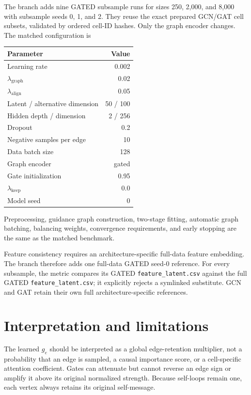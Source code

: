 \documentclass[11pt]{article}
\newcommand{\code}[1]{\texttt{#1}}
\begin{document}
The branch adds nine GATED subsample runs for sizes 250, 2,000, and 8,000 with
subsample seeds 0, 1, and 2.  They reuse the exact prepared GCN/GAT cell subsets,
validated by ordered cell-ID hashes.  Only the graph encoder changes.  The
matched configuration is
\begin{center}
\begin{tabular}{lr}
\toprule
Parameter & Value \\
\midrule
Learning rate & 0.002 \\
$\lambda_{\mathrm{graph}}$ & 0.02 \\
$\lambda_{\mathrm{align}}$ & 0.05 \\
Latent / alternative dimension & 50 / 100 \\
Hidden depth / dimension & 2 / 256 \\
Dropout & 0.2 \\
Negative samples per edge & 10 \\
Data batch size & 128 \\
Graph encoder & gated \\
Gate initialization & 0.95 \\
$\lambda_{\mathrm{keep}}$ & 0.0 \\
Model seed & 0 \\
\bottomrule
\end{tabular}
\end{center}
Preprocessing, guidance graph construction, two-stage fitting, automatic graph
batching, balancing weights, convergence requirements, and early stopping are
the same as the matched benchmark.

Feature consistency requires an architecture-specific full-data feature
embedding.  The branch therefore adds one full-data GATED seed-0 reference.
For every subsample, the metric compares its GATED \code{feature\_latent.csv}
against the full GATED \code{feature\_latent.csv}; it explicitly rejects a
symlinked substitute.  GCN and GAT retain their own full architecture-specific
references.

\section{Interpretation and limitations}

The learned $g_e$ should be interpreted as a global edge-retention multiplier,
not a probability that an edge is sampled, a causal importance score, or a
cell-specific attention coefficient.  Gates can attenuate but cannot reverse
an edge sign or amplify it above its original normalized strength.  Because
self-loops remain one, each vertex always retains its original self-message.
\end{document}

